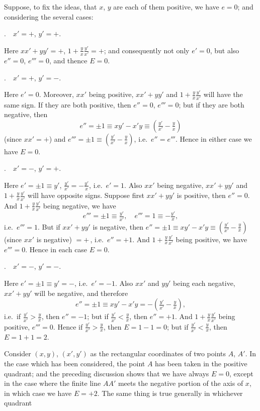 \documentclass[11pt]{article}
\begin{document}
Suppose, to fix the ideas, that $x$, $y$ are each of them positive, we have $e=0$; and considering the several cases:

\medskip
{}.\ \ $x'=+$, $y'=+$.

Here $xx'+yy'=+$, $1+\tfrac{y}{x}\tfrac{y'}{x'}=+$; and consequently not only $e'=0$, but also $e''=0$, $e'''=0$, and thence $E=0$.

\medskip
{}.\ \ $x'=+$, $y'=-$.

Here $e'=0$. Moreover, $xx'$ being positive, $xx'+yy'$ and $1+\tfrac{y}{x}\tfrac{y'}{x'}$ will have the same sign. If they are both positive, then $e''=0$, $e'''=0$; but if they are both negative, then
\[
e''=\pm 1\equiv xy'-x'y\equiv\left(\tfrac{y'}{x'}-\tfrac{y}{x}\right)
\]
(since $xx'=+$) and $e'''=\pm 1\equiv\left(\tfrac{y'}{x'}-\tfrac{y}{x}\right)$, i.e.\ $e''=e'''$. Hence in either case we have $E=0$.

\clearpage

.\ \ $x'=-$, $y'=+$.

Here $e'=\pm 1\equiv y'$, $\tfrac{y'}{x'}=-\tfrac{y'}{x}$, i.e.\ $e'=1$. Also $xx'$ being negative, $xx'+yy'$ and $1+\tfrac{y}{x}\tfrac{y'}{x'}$ will have opposite signs. Suppose first $xx'+yy'$ is positive, then $e''=0$. And $1+\tfrac{y}{x}\tfrac{y'}{x'}$ being negative, we have
\[
e'''=\pm 1\equiv\tfrac{y'}{x'},\quad e'''=1\equiv-\tfrac{y'}{x},
\]
i.e.\ $e'''=1$. But if $xx'+yy'$ is negative, then $e''=\pm 1\equiv xy'-x'y\equiv\left(\tfrac{y'}{x'}-\tfrac{y}{x}\right)$ (since $xx'$ is negative) $=+\,$, i.e.\ $e''=+1$. And $1+\tfrac{y}{x}\tfrac{y'}{x'}$ being positive, we have $e'''=0$. Hence in each case $E=0$.

\medskip
{}.\ \ $x'=-$, $y'=-$.

Here $e'=\pm 1\equiv y'=-$, i.e.\ $e'=-1$. Also $xx'$ and $yy'$ being each negative, $xx'+yy'$ will be negative, and therefore
\[
e''=\pm 1\equiv xy'-x'y=-\left(\tfrac{y'}{x'}-\tfrac{y}{x}\right),
\]
i.e.\ if $\tfrac{y'}{x'}>\tfrac{y}{x}$, then $e''=-1$; but if $\tfrac{y'}{x'}<\tfrac{y}{x}$, then $e''=+1$. And $1+\tfrac{y}{x}\tfrac{y'}{x'}$ being positive, $e'''=0$. Hence if $\tfrac{y'}{x'}>\tfrac{y}{x}$, then $E=1-1=0$; but if $\tfrac{y'}{x'}<\tfrac{y}{x}$, then $E=1+1=2$.

\medskip
Consider $(x,y)$, $(x',y')$ as the rectangular coordinates of two points $A$, $A'$. In the case which has been considered, the point $A$ has been taken in the positive quadrant; and the preceding discussion shows that we have always $E=0$, except in the case where the finite line $AA'$ meets the negative portion of the axis of $x$, in which case we have $E=+2$. The same thing is true generally in whichever quadrant
\end{document}

